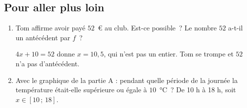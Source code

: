 \documentclass{article}
\newcommand{\rep}[1]{\textcolor{blue!70!black}{#1}}
\begin{document}
\subsection*{Pour aller plus loin}

\begin{enumerate}[resume]
  \item Tom affirme avoir payé $52$~€ au club. Est-ce possible~? Le nombre $52$ a-t-il un antécédent par $f$~?

  \rep{$4x + 10 = 52$ donne $x = 10{,}5$, qui n'est pas un entier. Tom se trompe et $52$ n'a pas d'antécédent.}

  \item Avec le graphique de la partie A : pendant quelle période de la journée la température était-elle supérieure ou égale à $10$~°C~? \rep{De 10 h à 18 h, soit $x \in [10\,;\,18]$.}
\end{enumerate}
\end{document}
